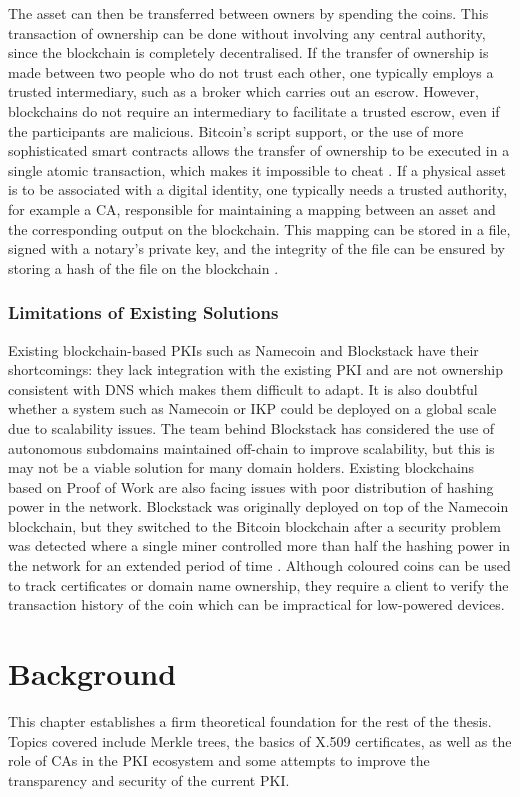 \documentclass{style/kththesis}
\begin{document}
The asset can then be transferred between owners by spending the coins. This transaction of ownership can be done without involving any central authority, since the blockchain is completely decentralised. If the transfer of ownership is made between two people who do not trust each other, one typically employs a trusted intermediary, such as a broker which carries out an escrow. However, blockchains do not require an intermediary to facilitate a trusted escrow, even if the participants are malicious. Bitcoin's script support, or the use of more sophisticated smart contracts allows the transfer of ownership to be executed in a single atomic transaction, which makes it impossible to cheat \cite{Rosenfeld12}. If a physical asset is to be associated with a digital identity, one typically needs a trusted authority, for example a CA, responsible for maintaining a mapping between an asset and the corresponding output on the blockchain. This mapping can be stored in a file, signed with a notary's private key, and the integrity of the file can be ensured by storing a hash of the file on the blockchain \cite{Mizrahi17}.

\subsection{Limitations of Existing Solutions}
Existing blockchain-based PKIs such as Namecoin and Blockstack have their shortcomings: they lack integration with the existing PKI and are not ownership consistent with DNS which makes them difficult to adapt. It is also doubtful whether a system such as Namecoin or IKP could be deployed on a global scale due to scalability issues. The team behind Blockstack has considered the use of autonomous subdomains maintained off-chain to improve scalability, but this is may not be a viable solution for many domain holders. Existing blockchains based on Proof of Work are also facing issues with poor distribution of hashing power in the network. Blockstack was originally deployed on top of the Namecoin blockchain, but they switched to the Bitcoin blockchain after a security problem was detected where a single miner controlled more than half the hashing power in the network for an extended period of time \cite{Ali16}. Although coloured coins can be used to track certificates or domain name ownership, they require a client to verify the transaction history of the coin which can be impractical for low-powered devices.

\chapter{Background}
\label{chap:background}
This chapter establishes a firm theoretical foundation for the rest of the thesis. Topics covered include Merkle trees, the basics of X.509 certificates, as well as the role of CAs in the PKI ecosystem and some attempts to improve the transparency and security of the current PKI.
\end{document}
